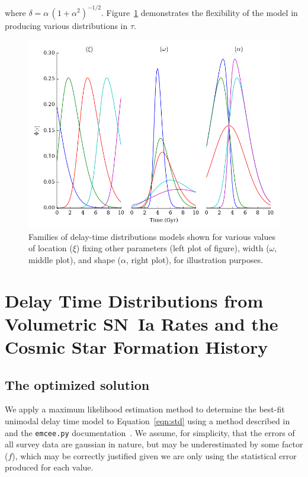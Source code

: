 \documentclass[apj]{aastex}
\begin{document}
where $\delta=\alpha\,(1+\alpha^2)^{-1/2}$. Figure~\ref{fig:dtd_families} demonstrates the flexibility of the model in producing various distributions in $\tau$. 

\begin{figure}[t]
   \centering
   \includegraphics[width=6.5in]{figure_dtd_families}
   \caption{\footnotesize Families of delay-time distributions models shown for various values of location ($\xi$) fixing other parameters (left plot of figure), width ($\omega$, middle plot), and shape ($\alpha$, right plot), for illustration purposes.}
   \label{fig:dtd_families}
\end{figure}

\section{Delay Time Distributions from Volumetric SN~Ia Rates and the Cosmic Star Formation History}

\subsection{The optimized solution}
We apply a maximum likelihood estimation method to determine the best-fit unimodal delay time model to Equation~\ref{eqn:std} using a method described in \cite{Hogg:2010fj} and the {\tt emcee.py} documentation~\citep{Foreman-Mackey:2013pd}. We assume, for simplicity, that the errors of all survey data are gaussian in nature, but may be underestimated by some factor ($f$), which may be correctly justified given we are only using the statistical error produced for each value. 
\end{document}
